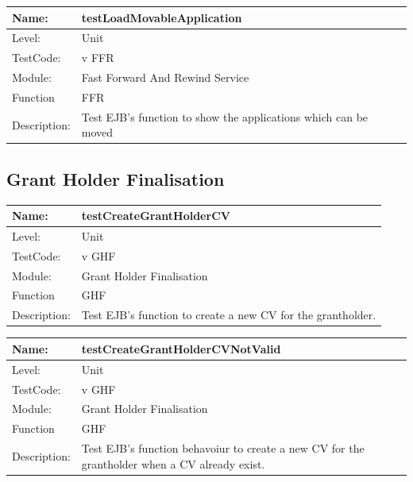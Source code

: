\documentclass[12pt]{article}
\begin{document}
\begin{center}
\begin{tabular}{|l|p{12cm}|}
\hline

 Name: & testLoadMovableApplication  \\
\hline
Level: & Unit \\
\hline
TestCode: & v FFR \\
\hline
Module:& Fast Forward And Rewind Service \\
\hline
Function & FFR \\
\hline
Description: & Test EJB's function to show the applications which can be moved\\
\hline
\end{tabular}
\end{center}

\subsection{Grant Holder Finalisation}

\begin{center}
\begin{tabular}{|l|p{12cm}|}
\hline

 Name: & testCreateGrantHolderCV  \\
\hline
Level: & Unit \\
\hline
TestCode: & v GHF \\
\hline
Module:& Grant Holder Finalisation \\
\hline
Function & GHF \\
\hline
Description: & Test EJB's function to create a new CV for the grantholder. \\
\hline
\end{tabular}
\end{center}

\begin{center}
\begin{tabular}{|l|p{12cm}|}
\hline

 Name: & testCreateGrantHolderCVNotValid  \\
\hline
Level: & Unit \\
\hline
TestCode: & v GHF \\
\hline
Module:& Grant Holder Finalisation \\
\hline
Function & GHF \\
\hline
Description: & Test EJB's function behavoiur to create a new CV for the grantholder when a CV already exist. \\
\hline
\end{tabular}
\end{center}
\end{document}
